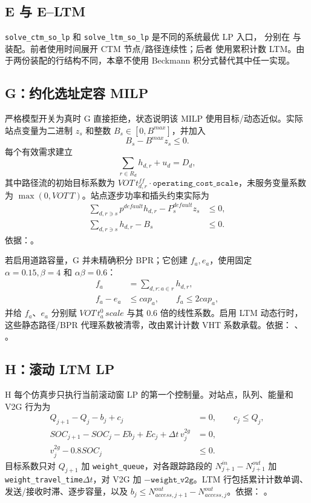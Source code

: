 \subsection{E 与 E--LTM}
\texttt{solve\_ctm\_so\_lp} 和 \texttt{solve\_ltm\_so\_lp} 是不同的系统最优 LP 入口，
分别在  与
 装配。前者使用时间展开 CTM 节点/路径连续性；后者
使用累积计数 LTM。由于两份装配的行结构不同，本章不使用 Beckmann 积分式替代其中任一实现。

\subsection{G：约化选址定容 MILP}
严格模型开关为真时 G 直接拒绝，状态说明该 MILP 使用目标/动态近似。实际站点变量为二进制
$z_s$ 和整数 $B_s\in[0,B^{max}]$，并加入
\begin{equation}
 B_s-B^{max}z_s\le0.
\end{equation}
每个有效需求建立
\begin{equation}
 \sum_{r\in R_d}h_{d,r}+u_d=D_d,
\end{equation}
其中路径流的初始目标系数为
$VOT\,t^{ff}_{d,r}\cdot\texttt{operating\_cost\_scale}$，未服务变量系数为
$\max(0,VOT\,T)$。站点逐步功率和插头约束实际为
\begin{align}
 \sum_{d,r\ni s}p^{default}h_{d,r}-P_s^{default}z_s&\le0,\\
 \sum_{d,r\ni s}h_{d,r}-B_s&\le0.
\end{align}
依据：。

若启用道路容量，G 并未精确积分 BPR；它创建 $f_a,e_a$，使用固定
$\alpha=0.15,\beta=4$ 和 $\alpha\beta=0.6$：
\begin{align}
 f_a&=\sum_{d,r:a\in r}h_{d,r},\\
 f_a-e_a&\le cap_a,\qquad f_a\le2cap_a,
\end{align}
并给 $f_a$、$e_a$ 分别赋 $VOT\,t_a^0\,scale$ 与其 $0.6$ 倍的线性系数。启用 LTM 动态行时，
这些静态路径/BPR 代理系数被清零，改由累计计数 VHT 系数承载。依据：
、
。

\subsection{H：滚动 LTM LP}
H 每个仿真步只执行当前滚动窗 LP 的第一个控制量。对站点，队列、能量和 V2G 行为为
\begin{align}
 Q_{j+1}-Q_j-b_j+c_j&=0,\qquad c_j\le Q_j,\\
 SOC_{j+1}-SOC_j-Eb_j+Ec_j+\Delta t\,v_j^{2g}&=0,\\
 v_j^{2g}-0.8SOC_j&\le0.
\end{align}
目标系数只对 $Q_{j+1}$ 加 \texttt{weight\_queue}，对各跟踪路段的
$N^{in}_{j+1}-N^{out}_{j+1}$ 加 \texttt{weight\_travel\_time}$\Delta t$，对 V2G 加
$-\texttt{weight\_v2g}$。LTM 行包括累计计数单调、发送/接收时滞、逐步容量，以及
$b_j\le N^{out}_{access,j+1}-N^{out}_{access,j}$。依据：
。

